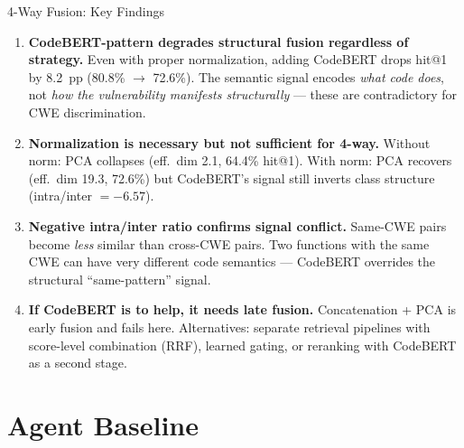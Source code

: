 \documentclass[aspectratio=169,10pt]{beamer}
\begin{document}
\begin{frame}{4-Way Fusion: Key Findings}

  \begin{enumerate}\setlength{\itemsep}{0.5em}

    \item[\textcolor{miss}{\faIcon{times-circle}}]
      \textbf{CodeBERT-pattern degrades structural fusion regardless of strategy.}
      Even with proper normalization, adding CodeBERT drops hit@1 by 8.2~pp
      (80.8\% $\to$ 72.6\%).
      The semantic signal encodes \textit{what code does}, not
      \textit{how the vulnerability manifests structurally} ---
      these are contradictory for CWE discrimination.

    \vspace{0.5em}
    \item[\textcolor{warn}{\faIcon{balance-scale}}]
      \textbf{Normalization is necessary but not sufficient for 4-way.}
      Without norm: PCA collapses (eff.\ dim 2.1, 64.4\% hit@1).
      With norm: PCA recovers (eff.\ dim 19.3, 72.6\%) but
      CodeBERT's signal still inverts class structure (intra/inter $= -6.57$).

    \vspace{0.5em}
    \item[\textcolor{c1}{\faIcon{chart-bar}}]
      \textbf{Negative intra/inter ratio confirms signal conflict.}
      Same-CWE pairs become \textit{less} similar than cross-CWE pairs.
      Two functions with the same CWE can have very
      different code semantics --- CodeBERT overrides the structural
      ``same-pattern'' signal.

    \vspace{0.5em}
    \item[\textcolor{c3}{\faIcon{lightbulb}}]
      \textbf{If CodeBERT is to help, it needs late fusion.}
      Concatenation + PCA is early fusion and fails here.
      Alternatives: separate retrieval pipelines with score-level
      combination (RRF), learned gating, or reranking with CodeBERT
      as a second stage.

  \end{enumerate}
\end{frame}


\section{Agent Baseline}
\end{document}
